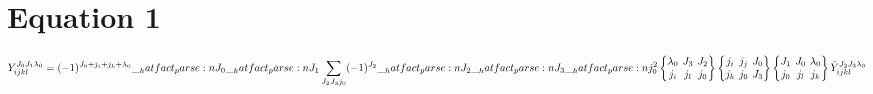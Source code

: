 \documentclass{scrartcl}
\newcommand{\sixj}[6]{\begingroup\setlength{\arraycolsep}{0.2em}\begin{Bmatrix} #1 & #2 & #3 \\ #4 & #5 & #6 \end{Bmatrix}\endgroup}
\begin{document}
\section{Equation 1}
\begin{dmath*}
Y_{i j k l}^{{J}_{0} {J}_{1} {{\lambda}}_{0}} = (-1)^{{J}_{0}+{j}_{i}+{j}_{k}+{{\lambda}}_{0}} \* \hatfact{{J}_{0}} \* \hatfact{{J}_{1}} \* \sum_{{J}_{2} {J}_{3} {j}_{0}} \* (-1)^{{J}_{2}} \* \hatfact{{J}_{2}} \* \hatfact{{J}_{3}} \* \hatfact{{j}_{0}^{2}} \* \sixj{{{\lambda}}_{0}}{{J}_{3}}{{J}_{2}}{{j}_{i}}{{j}_{l}}{{j}_{0}} \* \sixj{{j}_{i}}{{j}_{j}}{{J}_{0}}{{j}_{k}}{{j}_{0}}{{J}_{3}} \* \sixj{{J}_{1}}{{J}_{0}}{{{\lambda}}_{0}}{{j}_{0}}{{j}_{l}}{{j}_{k}} \* \bar{Y}_{i j k l}^{{J}_{2} {J}_{3} {{\lambda}}_{0}}
\end{dmath*}
\end{document}
